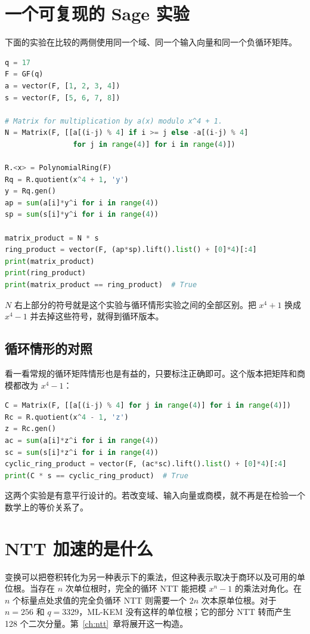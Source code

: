 \section{一个可复现的 Sage 实验}

下面的实验在比较的两侧使用同一个域、同一个输入向量和同一个负循环矩阵。

\begin{lstlisting}[language=Python]
q = 17
F = GF(q)
a = vector(F, [1, 2, 3, 4])
s = vector(F, [5, 6, 7, 8])

# Matrix for multiplication by a(x) modulo x^4 + 1.
N = Matrix(F, [[a[(i-j) % 4] if i >= j else -a[(i-j) % 4]
                for j in range(4)] for i in range(4)])

R.<x> = PolynomialRing(F)
Rq = R.quotient(x^4 + 1, 'y')
y = Rq.gen()
ap = sum(a[i]*y^i for i in range(4))
sp = sum(s[i]*y^i for i in range(4))

matrix_product = N * s
ring_product = vector(F, (ap*sp).lift().list() + [0]*4)[:4]
print(matrix_product)
print(ring_product)
print(matrix_product == ring_product)  # True
\end{lstlisting}

$N$ 右上部分的符号就是这个实验与循环情形实验之间的全部区别。把 $x^4+1$ 换成 $x^4-1$ 并去掉这些符号，就得到循环版本。

\subsection{循环情形的对照}

看一看常规的循环矩阵情形也是有益的，只要标注正确即可。这个版本把矩阵和商模都改为 $x^4-1$：

\begin{lstlisting}[language=Python]
C = Matrix(F, [[a[(i-j) % 4] for j in range(4)] for i in range(4)])
Rc = R.quotient(x^4 - 1, 'z')
z = Rc.gen()
ac = sum(a[i]*z^i for i in range(4))
sc = sum(s[i]*z^i for i in range(4))
cyclic_ring_product = vector(F, (ac*sc).lift().list() + [0]*4)[:4]
print(C * s == cyclic_ring_product)  # True
\end{lstlisting}

这两个实验是有意平行设计的。若改变域、输入向量或商模，就不再是在检验一个数学上的等价关系了。

\section{NTT 加速的是什么}

变换可以把卷积转化为另一种表示下的乘法，但这种表示取决于商环以及可用的单位根。当存在 $n$ 次单位根时，完全的循环 NTT 能把模 $x^n-1$ 的乘法对角化。在 $n$ 个标量点处求值的完全负循环 NTT 则需要一个 $2n$ 次本原单位根。对于 $n=256$ 和 $q=3329$，ML-KEM 没有这样的单位根；它的部分 NTT 转而产生 128 个二次分量。第~\ref{ch:ntt}~章将展开这一构造。

